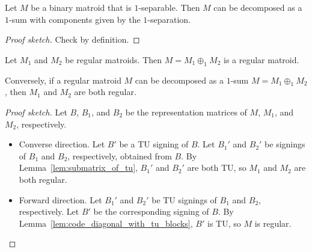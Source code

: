 \begin{lemma}
  \label{lem:code_1_sep_yields_1_sum}
  Let $M$ be a binary matroid that is $1$-separable.
  Then $M$ can be decomposed as a $1$-sum with components given by the $1$-separation.
\end{lemma}

\begin{proof}[Proof sketch]
  Check by definition.
\end{proof}


\begin{lemma}
  \label{lem:code_1_sum_of_regular}
  Let $M_{1}$ and $M_{2}$ be regular matroids. Then $M = M_{1} \oplus_{1} M_{2}$ is a regular matroid.

  Conversely, if a regular matroid $M$ can be decomposed as a $1$-sum $M = M_{1} \oplus_{1} M_{2}$, then $M_{1}$ and $M_{2}$ are both regular.
\end{lemma}

\begin{proof}[Proof sketch]
  Let $B$, $B_{1}$, and $B_{2}$ be the representation matrices of $M$, $M_{1}$, and $M_{2}$, respectively.
  \begin{itemize}
    \item Converse direction. Let $B'$ be a TU signing of $B$. Let $B_{1}'$ and $B_{2}'$ be signings of $B_{1}$ and $B_{2}$, respectively, obtained from $B$. By Lemma~\ref{lem:submatrix_of_tu}, $B_{1}'$ and $B_{2}'$ are both TU, so $M_{1}$ and $M_{2}$ are both regular.
    \item Forward direction. Let $B_{1}'$ and $B_{2}'$ be TU signings of $B_{1}$ and $B_{2}$, respectively. Let $B'$ be the corresponding signing of $B$. By Lemma~\ref{lem:code_diagonal_with_tu_blocks}, $B'$ is TU, so $M$ is regular.
  \end{itemize}
\end{proof}


